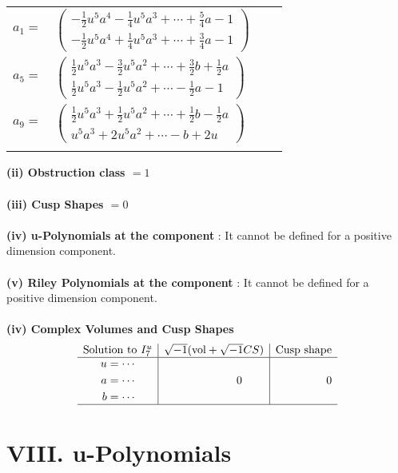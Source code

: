 \documentclass[1p]{elsarticle_modified}
\theoremstyle{definition}
\newcommand{\I}{\sqrt{-1}}
\begin{document}
\begin{tabular}{m{7pt} m{180pt} m{7pt} m{180pt} }
\flushright $a_{1}=$&$\begin{pmatrix}-\frac{1}{2} u^5 a^4-\frac{1}{4} u^5 a^3+\cdots+\frac{5}{4} a-1\\-\frac{1}{2} u^5 a^4+\frac{1}{4} u^5 a^3+\cdots+\frac{3}{4} a-1\end{pmatrix}$ \\
\flushright $a_{5}=$&$\begin{pmatrix}\frac{1}{2} u^5 a^3-\frac{3}{2} u^5 a^2+\cdots+\frac{3}{2} b+\frac{1}{2} a\\\frac{1}{2} u^5 a^3-\frac{1}{2} u^5 a^2+\cdots-\frac{1}{2} a-1\end{pmatrix}$ \\
\flushright $a_{9}=$&$\begin{pmatrix}\frac{1}{2} u^5 a^3+\frac{1}{2} u^5 a^2+\cdots+\frac{1}{2} b-\frac{1}{2} a\\u^5 a^3+2 u^5 a^2+\cdots- b+2 u\end{pmatrix}$\\&\end{tabular}
\flushleft \textbf{(ii) Obstruction class $= 1$}\\~\\
\flushleft \textbf{(iii) Cusp Shapes $= 0$}\\~\\
\flushleft \textbf{(iv) u-Polynomials at the component} : It cannot be defined for a positive dimension component.\\~\\
\flushleft \textbf{(v) Riley Polynomials at the component} : It cannot be defined for a positive dimension component.\\~\\
\newpage\flushleft \textbf{(iv) Complex Volumes and Cusp Shapes}
$$\begin{array}{c|c|c} 
\text{Solution to }I^u_{7}& \I (\text{vol} + \sqrt{-1}CS) & \text{Cusp shape}\\
 \hline 
\begin{aligned}
u &= \cdots \\
a &= \cdots \\
b &= \cdots\end{aligned}
 & \phantom{-0.000000 } 0 & \phantom{-0.000000 } 0\\
 \hline 
 \end{array}
$$
\newpage\renewcommand{\arraystretch}{1}
\centering \section*{ VIII. u-Polynomials}
\end{document}
